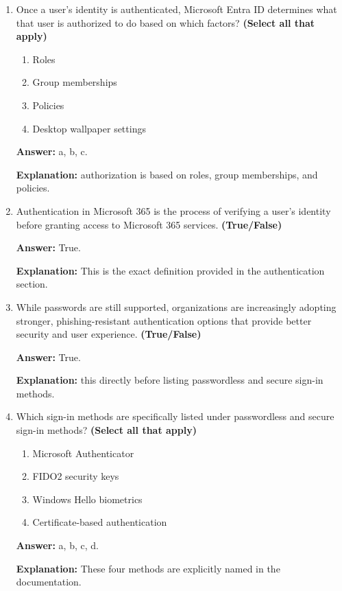 \documentclass[10pt]{article}
\begin{document}
\begin{enumerate}[leftmargin=*]
\textbf{Explanation:} These are the tools named in the hybrid identity section.

\item Once a user’s identity is authenticated, Microsoft Entra ID determines what that user is authorized to do based on which factors? \textbf{(Select all that apply)}
\begin{enumerate}[label=\alph*., leftmargin=1.5em]
\item Roles
\item Group memberships
\item Policies
\item Desktop wallpaper settings
\end{enumerate}
\textbf{Answer:} a, b, c.

\textbf{Explanation:} authorization is based on roles, group memberships, and policies.

\item Authentication in Microsoft 365 is the process of verifying a user’s identity before granting access to Microsoft 365 services. \textbf{(True/False)}

\textbf{Answer:} True.

\textbf{Explanation:} This is the exact definition provided in the authentication section.

\item While passwords are still supported, organizations are increasingly adopting stronger, phishing-resistant authentication options that provide better security and user experience. \textbf{(True/False)}

\textbf{Answer:} True.

\textbf{Explanation:} this directly before listing passwordless and secure sign-in methods.

\item Which sign-in methods are specifically listed under passwordless and secure sign-in methods? \textbf{(Select all that apply)}
\begin{enumerate}[label=\alph*., leftmargin=1.5em]
\item Microsoft Authenticator
\item FIDO2 security keys
\item Windows Hello biometrics
\item Certificate-based authentication
\end{enumerate}
\textbf{Answer:} a, b, c, d.

\textbf{Explanation:} These four methods are explicitly named in the documentation.


\end{enumerate}
\end{document}

